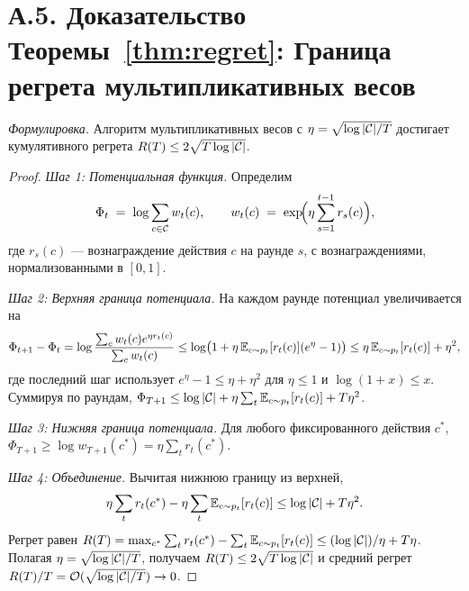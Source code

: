 \section*{А.5. Доказательство Теоремы~\ref{thm:regret}: Граница регрета мультипликативных весов}
\label{app:proof_regret}

\noindent\textit{Формулировка.} Алгоритм мультипликативных весов с $\eta=\sqrt{\log|\mathcal{C}|/T}$ достигает кумулятивного регрета $R(T)\le 2\sqrt{T\log|\mathcal{C}|}$.

\begin{proof}
\textit{Шаг 1: Потенциальная функция.} Определим
\begin{equation*}
\Phi_t \;=\; \log\sum_{c\in\mathcal{C}}w_t(c),
\qquad
w_t(c) \;=\; \exp\!\Bigl(\eta\sum_{s=1}^{t-1}r_s(c)\Bigr),
\end{equation*}
где $r_s(c)$ --- вознаграждение действия $c$ на раунде $s$, с вознаграждениями, нормализованными в $[0,1]$.

\textit{Шаг 2: Верхняя граница потенциала.} На каждом раунде потенциал увеличивается на
\begin{equation}
\Phi_{t+1}-\Phi_t = \log\frac{\sum_c w_t(c)e^{\eta r_t(c)}}{\sum_c w_t(c)}
\le \log\bigl(1+\eta\,\mathbb{E}_{c\sim p_t}[r_t(c)](e^\eta-1)\bigr)
\le \eta\,\mathbb{E}_{c\sim p_t}[r_t(c)] + \eta^2,
\end{equation}
где последний шаг использует $e^\eta-1\le\eta+\eta^2$ для $\eta\le 1$ и $\log(1+x)\le x$. Суммируя по раундам, $\Phi_{T+1}\le\log|\mathcal{C}|+\eta\sum_t\mathbb{E}_{c\sim p_t}[r_t(c)]+T\eta^2$.

\textit{Шаг 3: Нижняя граница потенциала.} Для любого фиксированного действия $c^*$, $\Phi_{T+1}\ge\log w_{T+1}(c^*) = \eta\sum_t r_t(c^*)$.

\textit{Шаг 4: Объединение.} Вычитая нижнюю границу из верхней,
\begin{equation}
\eta\sum_t r_t(c^*) - \eta\sum_t\mathbb{E}_{c\sim p_t}[r_t(c)] \le \log|\mathcal{C}| + T\eta^2.
\end{equation}
Регрет равен $R(T) = \max_{c^*}\sum_t r_t(c^*) - \sum_t\mathbb{E}_{c\sim p_t}[r_t(c)] \le (\log|\mathcal{C}|)/\eta + T\eta$. Полагая $\eta=\sqrt{\log|\mathcal{C}|/T}$, получаем $R(T)\le 2\sqrt{T\log|\mathcal{C}|}$ и средний регрет $R(T)/T = \mathcal{O}(\sqrt{\log|\mathcal{C}|/T})\to 0$.
\end{proof}


